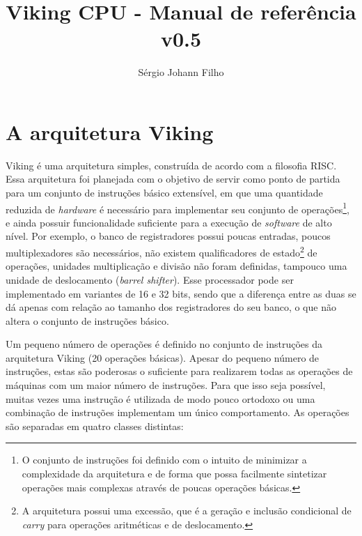 \documentclass{extreport}
\begin{document}
\pagestyle{empty}
\title{\textbf{Viking CPU - Manual de referência v0.5}}
\author{Sérgio Johann Filho}

\maketitle


\renewcommand{\cftchapdotsep}{\cftdotsep}
\tableofcontents

\pagestyle{fancy}
\fancyhf{}
\lhead[]{\thepage}
\rhead[\thepage]{}
\onehalfspacing


\newpage
\thispagestyle{empty}

\chapter{A arquitetura Viking}
Viking é uma arquitetura simples, construída de acordo com a filosofia RISC. Essa arquitetura foi planejada com o objetivo de servir como ponto de partida para um conjunto de instruções básico extensível, em que uma quantidade reduzida de \textit{hardware} é necessário para implementar seu conjunto de operações\footnote{O conjunto de instruções foi definido com o intuito de minimizar a complexidade da arquitetura e de forma que possa facilmente sintetizar operações mais complexas através de poucas operações básicas.}, e ainda possuir funcionalidade suficiente para a execução de \textit{software} de alto nível. Por exemplo, o banco de registradores possui poucas entradas, poucos multiplexadores são necessários, não existem qualificadores de estado\footnote{A arquitetura possui uma excessão, que é a geração e inclusão condicional de \textit{carry} para operações aritméticas e de deslocamento.} de operações, unidades multiplicação e divisão não foram definidas, tampouco uma unidade de deslocamento (\textit{barrel shifter}). Esse processador pode ser implementado em variantes de 16 e 32 bits, sendo que a diferença entre as duas se dá apenas com relação ao tamanho dos registradores do seu banco, o que não altera o conjunto de instruções básico.

Um pequeno número de operações é definido no conjunto de instruções da arquitetura Viking (20 operações básicas). Apesar do pequeno número de instruções, estas são poderosas o suficiente para realizarem todas as operações de máquinas com um maior número de instruções. Para que isso seja possível, muitas vezes uma instrução é utilizada de modo pouco ortodoxo ou uma combinação de instruções implementam um único comportamento. As operações são separadas em quatro classes distintas:
\end{document}
